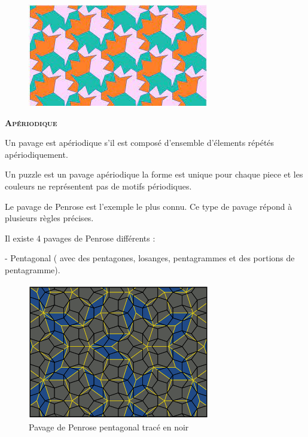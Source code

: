 \documentclass{article}
\begin{document}
\begin{figure} [h]
    \center
    \includegraphics [scale=0.5] {image/Ex1_pavage.jpg}
\end{figure}

\hspace{1.5cm}

\textbf{\textsc{Apériodique}}

Un pavage est apériodique s'il est composé d'ensemble d'élements répétés apériodiquement.

Un puzzle est un pavage apériodique la forme est unique pour chaque piece et les couleurs ne représentent pas de motifs périodiques.


Le pavage de Penrose est l'exemple le plus connu.
Ce type de pavage répond à plusieurs règles précises.

\newpage

Il existe 4 pavages de Penrose différents :

\hspace{1cm}

- Pentagonal ( avec des pentagones, losanges, pentagrammes et des portions de pentagramme).

\begin{figure} [h]
    \center
    \includegraphics [scale=0.4] {image/penrose_pentagone.png}
    \caption{Pavage de Penrose pentagonal tracé en noir}
\end{figure}

\hspace{1.5cm}
\end{document}
